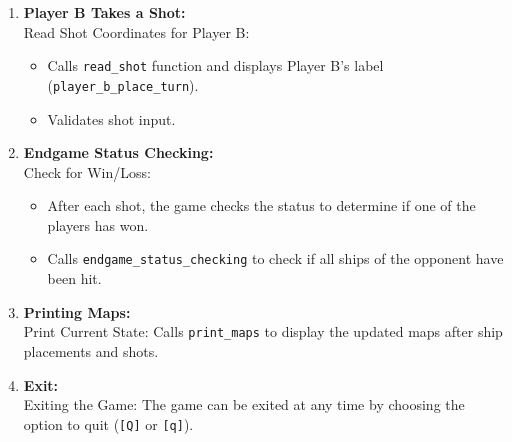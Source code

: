 \begin{enumerate}
    \item \textbf{Player B Takes a Shot:} \\[6pt]
    Read Shot Coordinates for Player B:
    \begin{itemize}
        \item Calls \texttt{read\_shot} function and displays Player B's label (\texttt{player\_b\_place\_turn}).
        \item Validates shot input.
    \end{itemize}

    \item \textbf{Endgame Status Checking:} \\[6pt]
    Check for Win/Loss:
    \begin{itemize}
        \item After each shot, the game checks the status to determine if one of the players has won.
        \item Calls \texttt{endgame\_status\_checking} to check if all ships of the opponent have been hit.
    \end{itemize}

    \item \textbf{Printing Maps:} \\[6pt]
    Print Current State: Calls \texttt{print\_maps} to display the updated maps after ship placements and shots.

    \item \textbf{Exit:} \\[6pt]
    Exiting the Game: The game can be exited at any time by choosing the option to quit (\texttt{[Q]} or \texttt{[q]}).
\end{enumerate}

